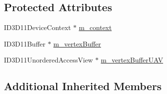\subsection*{Protected Attributes}
\begin{DoxyCompactItemize}
\item 
I\+D3\+D11\+Device\+Context $\ast$ \hyperlink{classbt_d_x11_vertex_buffer_descriptor_a31bcee68cd2fd39a374ddf10925d8595}{m\+\_\+context}
\item 
I\+D3\+D11\+Buffer $\ast$ \hyperlink{classbt_d_x11_vertex_buffer_descriptor_a29c0bf57f93456ad4eab166d55e50546}{m\+\_\+vertex\+Buffer}
\item 
I\+D3\+D11\+Unordered\+Access\+View $\ast$ \hyperlink{classbt_d_x11_vertex_buffer_descriptor_a583e863d100a338649a9186eee43c761}{m\+\_\+vertex\+Buffer\+U\+A\+V}
\end{DoxyCompactItemize}
\subsection*{Additional Inherited Members}


